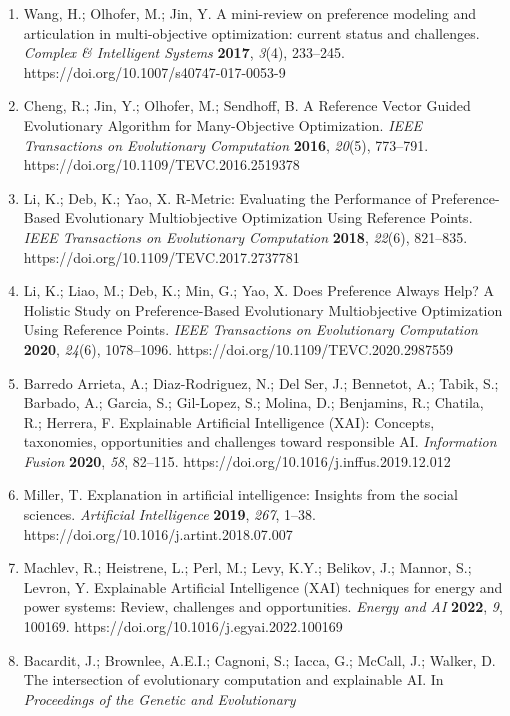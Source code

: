\documentclass[
  10pt,
  a4paper,
]{article}
\begin{document}
\begin{enumerate}
\item
  Wang, H.; Olhofer, M.; Jin, Y. A mini-review on preference modeling
  and articulation in multi-objective optimization: current status and
  challenges. \emph{Complex \& Intelligent Systems} \textbf{2017},
  \emph{3}(4), 233--245. https://doi.org/10.1007/s40747-017-0053-9
\item
  Cheng, R.; Jin, Y.; Olhofer, M.; Sendhoff, B. A Reference Vector
  Guided Evolutionary Algorithm for Many-Objective Optimization.
  \emph{IEEE Transactions on Evolutionary Computation} \textbf{2016},
  \emph{20}(5), 773--791. https://doi.org/10.1109/TEVC.2016.2519378
\item
  Li, K.; Deb, K.; Yao, X. R-Metric: Evaluating the Performance of
  Preference-Based Evolutionary Multiobjective Optimization Using
  Reference Points. \emph{IEEE Transactions on Evolutionary Computation}
  \textbf{2018}, \emph{22}(6), 821--835.
  https://doi.org/10.1109/TEVC.2017.2737781
\item
  Li, K.; Liao, M.; Deb, K.; Min, G.; Yao, X. Does Preference Always
  Help? A Holistic Study on Preference-Based Evolutionary Multiobjective
  Optimization Using Reference Points. \emph{IEEE Transactions on
  Evolutionary Computation} \textbf{2020}, \emph{24}(6), 1078--1096.
  https://doi.org/10.1109/TEVC.2020.2987559
\item
  Barredo Arrieta, A.; Diaz-Rodriguez, N.; Del Ser, J.; Bennetot, A.;
  Tabik, S.; Barbado, A.; Garcia, S.; Gil-Lopez, S.; Molina, D.;
  Benjamins, R.; Chatila, R.; Herrera, F. Explainable Artificial
  Intelligence (XAI): Concepts, taxonomies, opportunities and challenges
  toward responsible AI. \emph{Information Fusion} \textbf{2020},
  \emph{58}, 82--115. https://doi.org/10.1016/j.inffus.2019.12.012
\item
  Miller, T. Explanation in artificial intelligence: Insights from the
  social sciences. \emph{Artificial Intelligence} \textbf{2019},
  \emph{267}, 1--38. https://doi.org/10.1016/j.artint.2018.07.007
\item
  Machlev, R.; Heistrene, L.; Perl, M.; Levy, K.Y.; Belikov, J.; Mannor,
  S.; Levron, Y. Explainable Artificial Intelligence (XAI) techniques
  for energy and power systems: Review, challenges and opportunities.
  \emph{Energy and AI} \textbf{2022}, \emph{9}, 100169.
  https://doi.org/10.1016/j.egyai.2022.100169
\item
  Bacardit, J.; Brownlee, A.E.I.; Cagnoni, S.; Iacca, G.; McCall, J.;
  Walker, D. The intersection of evolutionary computation and
  explainable AI. In \emph{Proceedings of the Genetic and Evolutionary
}
\end{enumerate}
\end{document}
